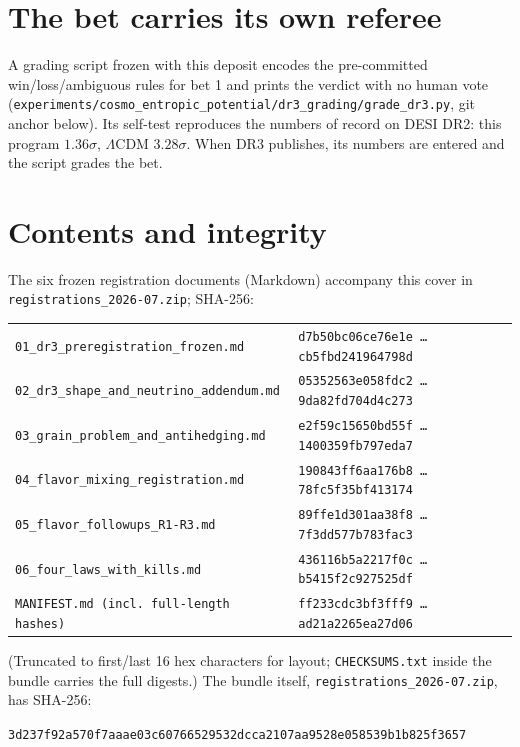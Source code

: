\documentclass[11pt]{article}
\newcommand{\code}[1]{\texttt{\small #1}}
\begin{document}
\section*{The bet carries its own referee}
A grading script frozen with this deposit encodes the pre-committed win/loss/ambiguous
rules for bet 1 and prints the verdict with no human vote
(\code{experiments/cosmo\_entropic\_potential/dr3\_grading/grade\_dr3.py}, git anchor
below). Its self-test reproduces the numbers of record on DESI DR2: this program
$1.36\sigma$, $\Lambda$CDM $3.28\sigma$. When DR3 publishes, its numbers are entered and
the script grades the bet.

\section*{Contents and integrity}
The six frozen registration documents (Markdown) accompany this cover in
\code{registrations\_2026-07.zip}; SHA-256:

\begin{center}\scriptsize
\begin{tabular}{@{}ll@{}}
\toprule
\code{01\_dr3\_preregistration\_frozen.md} & \code{d7b50bc06ce76e1e\,\ldots\,cb5fbd241964798d} \\
\code{02\_dr3\_shape\_and\_neutrino\_addendum.md} & \code{05352563e058fdc2\,\ldots\,9da82fd704d4c273} \\
\code{03\_grain\_problem\_and\_antihedging.md} & \code{e2f59c15650bd55f\,\ldots\,1400359fb797eda7} \\
\code{04\_flavor\_mixing\_registration.md} & \code{190843ff6aa176b8\,\ldots\,78fc5f35bf413174} \\
\code{05\_flavor\_followups\_R1-R3.md} & \code{89ffe1d301aa38f8\,\ldots\,7f3dd577b783fac3} \\
\code{06\_four\_laws\_with\_kills.md} & \code{436116b5a2217f0c\,\ldots\,b5415f2c927525df} \\
\code{MANIFEST.md (incl.\ full-length hashes)} & \code{ff233cdc3bf3fff9\,\ldots\,ad21a2265ea27d06} \\
\bottomrule
\end{tabular}
\end{center}

(Truncated to first/last 16 hex characters for layout; \code{CHECKSUMS.txt} inside the
bundle carries the full digests.) The bundle itself, \code{registrations\_2026-07.zip},
has SHA-256:

\begin{center}\scriptsize
\code{3d237f92a570f7aaae03c60766529532dcca2107aa9528e058539b1b825f3657}
\end{center}
\end{document}
